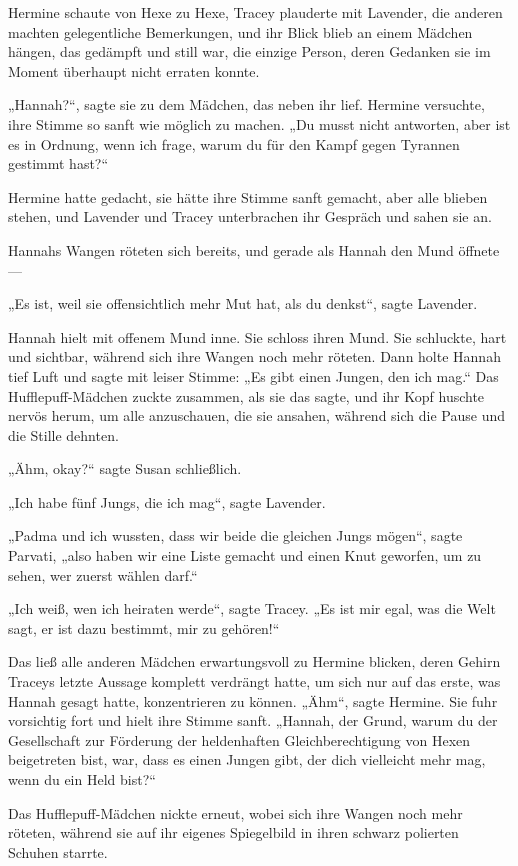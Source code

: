 {Hermine schaute von Hexe zu Hexe, Tracey plauderte mit Lavender, die anderen machten gelegentliche Bemerkungen, und ihr Blick blieb an einem Mädchen hängen, das gedämpft und still war, die einzige Person, deren Gedanken sie im Moment überhaupt nicht erraten konnte.

„Hannah?“, sagte sie zu dem Mädchen, das neben ihr lief. Hermine versuchte, ihre Stimme so sanft wie möglich zu machen. „Du musst nicht antworten, aber ist es in Ordnung, wenn ich frage, warum du für den Kampf gegen Tyrannen gestimmt hast?“

Hermine hatte gedacht, sie hätte ihre Stimme sanft gemacht, aber alle blieben stehen, und Lavender und Tracey unterbrachen ihr Gespräch und sahen sie an.

Hannahs Wangen röteten sich bereits, und gerade als Hannah den Mund öffnete—

„Es ist, weil sie offensichtlich mehr Mut hat, als du denkst“, sagte Lavender.

Hannah hielt mit offenem Mund inne. Sie schloss ihren Mund. Sie schluckte, hart und sichtbar, während sich ihre Wangen noch mehr röteten. Dann holte Hannah tief Luft und sagte mit leiser Stimme: „Es gibt einen Jungen, den ich mag.“ Das Hufflepuff-Mädchen zuckte zusammen, als sie das sagte, und ihr Kopf huschte nervös herum, um alle anzuschauen, die sie ansahen, während sich die Pause und die Stille dehnten.

„Ähm, okay?“ sagte Susan schließlich.

„Ich habe fünf Jungs, die ich mag“, sagte Lavender.

„Padma und ich wussten, dass wir beide die gleichen Jungs mögen“, sagte Parvati, „also haben wir eine Liste gemacht und einen Knut geworfen, um zu sehen, wer zuerst wählen darf.“

„Ich weiß, wen ich heiraten werde“, sagte Tracey. „Es ist mir egal, was die Welt sagt, er ist dazu bestimmt, mir zu gehören!“

Das ließ alle anderen Mädchen erwartungsvoll zu Hermine blicken, deren Gehirn Traceys letzte Aussage komplett verdrängt hatte, um sich nur auf das erste, was Hannah gesagt hatte, konzentrieren zu können. „Ähm“, sagte Hermine. Sie fuhr vorsichtig fort und hielt ihre Stimme sanft. „Hannah, der Grund, warum du der Gesellschaft zur Förderung der heldenhaften Gleichberechtigung von Hexen beigetreten bist, war, dass es einen Jungen gibt, der dich vielleicht mehr mag, wenn du ein Held bist?“

Das Hufflepuff-Mädchen nickte erneut, wobei sich ihre Wangen noch mehr röteten, während sie auf ihr eigenes Spiegelbild in ihren schwarz polierten Schuhen starrte.

}
